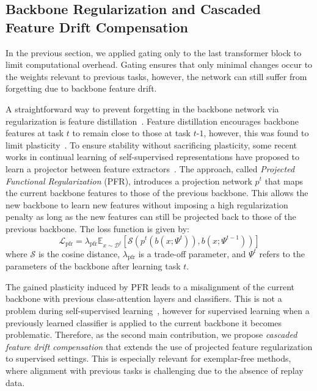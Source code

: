 \documentclass[twocolumn]{svjour3}          %
\begin{document}
\subsection{Backbone Regularization and Cascaded Feature Drift Compensation}
\label{sec:backbone}
In the previous section, we applied gating only to the last transformer block to limit computational overhead. Gating ensures that only minimal changes occur to the weights relevant to previous tasks, however, the network can still suffer from forgetting due to backbone feature drift.  

A straightforward way to prevent forgetting in the backbone network via regularization is feature distillation~\citep{hou2019learning}. Feature distillation encourages backbone features at task $t$ to remain close to those at task $t\textit{-}1$, however, this was found to limit plasticity~\citep{douillard2020podnet}. To ensure stability without sacrificing plasticity, some recent works in continual learning of self-supervised representations have proposed to learn a projector between feature extractors~\citep{fini2022self, gomez2022continually}. The approach, called \emph{Projected Functional Regularization} (PFR), 
introduces a projection network $p^t$ that maps the current backbone features to those of the previous backbone. This allows the new backbone to learn new features without imposing a high regularization penalty as long as the new features can still be projected back to those of the previous backbone. The  loss function is given by:
\begin{equation}
\mathcal{L}_{\text{pfr}}=
\lambda_{\text{pfr}} \mathbb{E}_{x \sim \mathcal{D}^t }
\left[\mathcal{S} \left( p^t\left(b\left(x;\Psi^t\right)\right), b\left(x;\Psi^{t-1}\right) \right)\right]
\label{eq:loss_prj}
\end{equation}
where $\mathcal{S}$ is the cosine distance, $\lambda_{\text{pfr}}$ is a trade-off parameter, and $\Psi^t$ refers to the parameters of the backbone after learning task $t$.

The gained plasticity induced by PFR leads to a misalignment of the current backbone with previous class-attention layers and classifiers. This is not a problem during self-supervised learning~\citep{fini2022self, gomez2022continually}, however for supervised learning when a previously learned classifier is applied to the current backbone it becomes problematic. Therefore, as the second main contribution, we propose \emph{cascaded feature drift compensation} that extends the use of projected feature regularization to supervised settings. This is especially relevant for exemplar-free methods, where alignment with previous tasks is challenging due to the absence of replay data.
\end{document}
